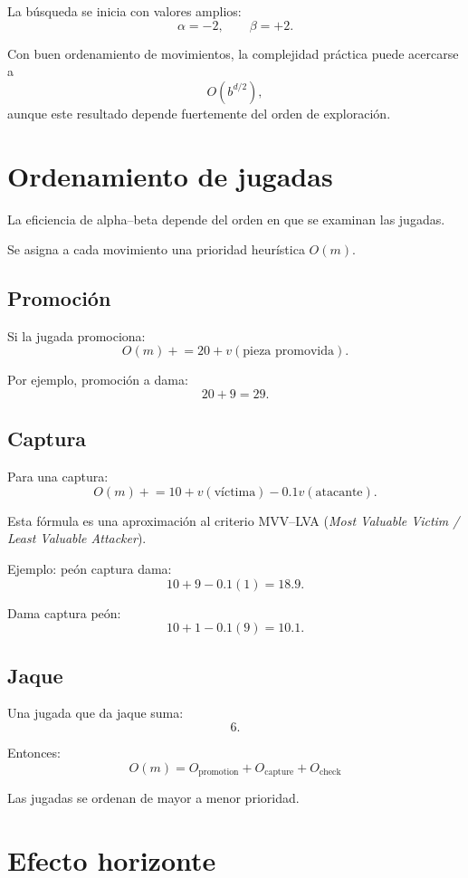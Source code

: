 \documentclass[11pt,a4paper]{article}
\begin{document}
La búsqueda se inicia con valores amplios:
\[
\alpha=-2,\qquad \beta=+2.
\]

Con buen ordenamiento de movimientos, la complejidad práctica puede acercarse a
\[
O(b^{d/2}),
\]
aunque este resultado depende fuertemente del orden de exploración.

\section{Ordenamiento de jugadas}

La eficiencia de alpha--beta depende del orden en que se examinan las jugadas.

Se asigna a cada movimiento una prioridad heurística $O(m)$.

\subsection{Promoción}

Si la jugada promociona:
\[
O(m)\mathrel{+}=20+v(\text{pieza promovida}).
\]

Por ejemplo, promoción a dama:
\[
20+9=29.
\]

\subsection{Captura}

Para una captura:
\[
O(m)\mathrel{+}=
10+v(\text{víctima})
-0.1v(\text{atacante}).
\]

Esta fórmula es una aproximación al criterio MVV--LVA
(\emph{Most Valuable Victim / Least Valuable Attacker}).

Ejemplo: peón captura dama:
\[
10+9-0.1(1)=18.9.
\]

Dama captura peón:
\[
10+1-0.1(9)=10.1.
\]

\subsection{Jaque}

Una jugada que da jaque suma:
\[
6.
\]

Entonces:
\[
\boxed{
O(m)=
O_{\mathrm{promotion}}
+
O_{\mathrm{capture}}
+
O_{\mathrm{check}}
}
\]

Las jugadas se ordenan de mayor a menor prioridad.

\section{Efecto horizonte}
\end{document}
